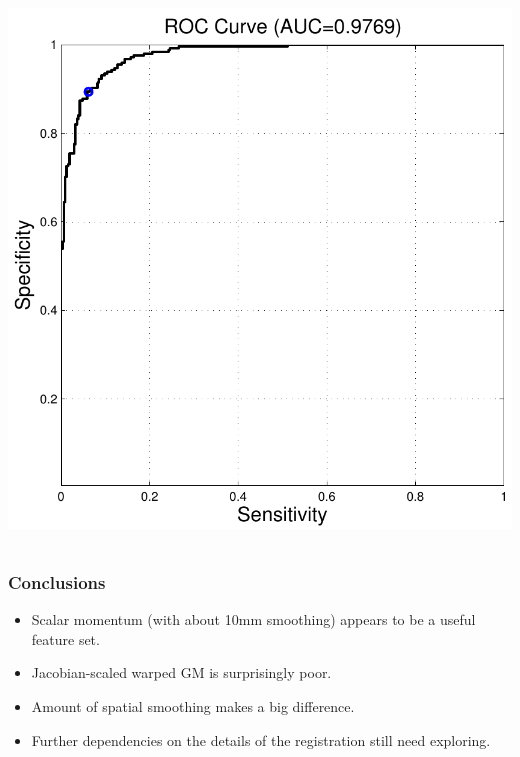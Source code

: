 \begin{frame}
\begin{columns}[c]
\includegraphics[width=1\textwidth]{sex_roc}
\end{columns}
\end{frame}

\begin{frame}
\frametitle{Conclusions}
\begin{itemize}
\item{Scalar momentum (with about 10mm smoothing) appears to be a useful feature set.}
\item{Jacobian-scaled warped GM is surprisingly poor.}
\item{Amount of spatial smoothing makes a big difference.}
\item{Further dependencies on the details of the registration still need exploring.}
\end{itemize}
\end{frame}

